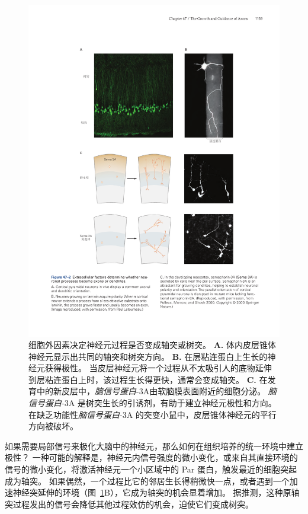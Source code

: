 \begin{figure}[htbp]
	\centering
	\includegraphics[width=0.9\linewidth]{chap47/fig_47_2}
	\caption{细胞外因素决定神经元过程是否变成轴突或树突。
		\textbf{A.} 体内皮层锥体神经元显示出共同的轴突和树突方向。
		\textbf{B.} 在层粘连蛋白上生长的神经元获得极性。
		当皮层神经元将一个过程从不太吸引人的底物延伸到层粘连蛋白上时，该过程生长得更快，通常会变成轴突。
		\textbf{C.} 在发育中的新皮层中，\textit{脑信号蛋白}-3A由软脑膜表面附近的细胞分泌。
		\textit{脑信号蛋白}-3A 是树突生长的引诱剂，有助于建立神经元极性和方向。
		在缺乏功能性\textit{脑信号蛋白}-3A 的突变小鼠中，皮层锥体神经元的平行方向被破坏。}
	\label{fig:47_2}
\end{figure}


如果需要局部信号来极化大脑中的神经元，那么如何在组织培养的统一环境中建立极性？
一种可能的解释是，神经元内信号强度的微小变化，或来自其直接环境的信号的微小变化，将激活神经元一个小区域中的 Par 蛋白，触发最近的细胞突起成为轴突。
如果偶然，一个过程比它的邻居生长得稍微快一点，或者遇到一个加速神经突延伸的环境（图~\ref{fig:47_2}B），它成为轴突的机会显着增加。
据推测，这种原轴突过程发出的信号会降低其他过程效仿的机会，迫使它们变成树突。




